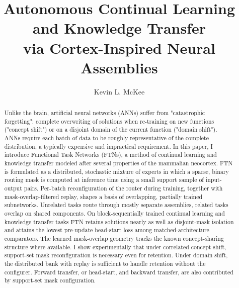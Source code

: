 \documentclass[11pt]{article}
\title{Autonomous Continual Learning and Knowledge Transfer\\ via Cortex-Inspired Neural Assemblies}
\author[1]{Kevin L. McKee}
\date{}
\begin{document}
\maketitle

\begin{abstract}
Unlike the brain, artificial neural networks (ANNs) suffer from "catastrophic forgetting": complete overwriting of solutions when re-training on new functions ("concept shift") or on a disjoint domain of the current function ("domain shift").
ANNs require each batch of data to be roughly representative of the complete distribution, a typically expensive and impractical requirement.
In this paper, I introduce Functional Task Networks (FTNs), a method of continual learning and knowledge transfer modeled after several properties of the mammalian neocortex.
FTN is formulated as a distributed, stochastic mixture of experts in which a sparse, binary routing mask is computed at inference time using a small support sample of input-output pairs.
Per-batch reconfiguration of the router during training, together with mask-overlap-filtered replay, shapes a basis of overlapping, partially trained subnetworks.
Unrelated tasks route through mostly separate assemblies, related tasks overlap on shared components. 
On block-sequentially trained continual learning and knowledge transfer tasks FTN retains solutions nearly as well as disjoint-mask isolation and attains the lowest pre-update head-start loss among matched-architecture comparators. 
The learned mask-overlap geometry tracks the known concept-sharing structure where available. 
I show experimentally that under correlated concept shift, support-set mask reconfiguration is necessary even for retention. 
Under domain shift, the distributed bank with replay is sufficient to handle retention without the configurer. 
Forward transfer, or head-start, and backward transfer, are also contributed by support-set mask configuration.
\end{abstract}

\end{document}
